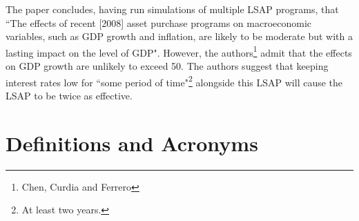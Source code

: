 \documentclass[notitlepage,12pt]{report}
\begin{document}
\begin{appendices}
	The paper concludes, having run simulations of multiple LSAP programs, that ``The effects of recent [2008] asset purchase programs on macroeconomic variables, such as GDP growth and inflation, are likely to be moderate but with a lasting impact on the level of GDP".\cite[p.37]{chen_macroeconomic_2011} However, the authors\footnote{Chen, Curdia and Ferrero} admit that the effects on GDP growth are unlikely to exceed 50\textpertenthousand. The authors suggest that keeping interest rates low for ``some period of time"\footnote{At least two years.} alongside this LSAP will cause the LSAP to be twice as effective.
	
	
	\section{Definitions and Acronyms}
	

\end{appendices}
\end{document}
